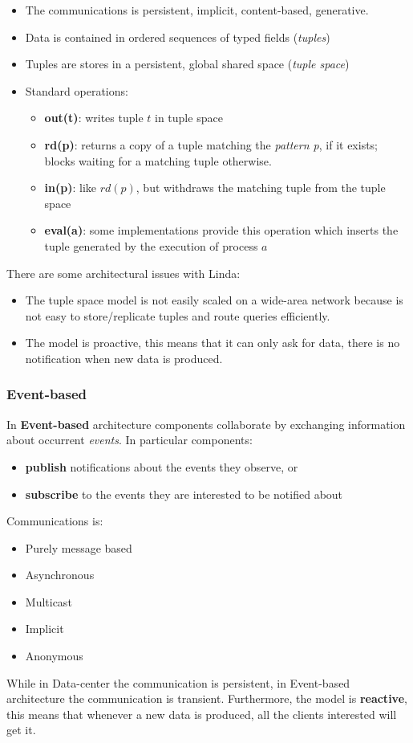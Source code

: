 \documentclass[10pt,a4paper]{article}
\begin{document}
\begin{itemize}
	\item The communications is persistent, implicit, content-based, generative.
	\item Data is contained in ordered sequences of typed fields (\textit{tuples})
	\item Tuples are stores in a persistent, global shared space (\textit{tuple space})
	\item Standard operations:
	\begin{itemize}
		\item \textbf{out(t)}: writes tuple $t$ in tuple space
		\item \textbf{rd(p)}: returns a copy of a tuple matching the \textit{pattern p}, if it exists; blocks waiting for a matching tuple otherwise.
		\item \textbf{in(p)}: like $rd(p)$, but withdraws the matching tuple from the tuple space
		\item \textbf{eval(a)}: some implementations provide this operation which inserts the tuple generated by the execution of process $a$
	\end{itemize}
\end{itemize}
There are some architectural issues with Linda:
\begin{itemize}
	\item The tuple space model is not easily scaled on a wide-area network because is not easy to store/replicate tuples and route queries efficiently.
	\item The model is proactive, this means that it can only ask for data, there is no notification when new data is produced.
\end{itemize}
\subsubsection{Event-based}
In \textbf{Event-based} architecture components collaborate by exchanging information about occurrent \textit{events}. In particular components:
\begin{itemize}
	\item \textbf{publish} notifications about the events they observe, or
	\item \textbf{subscribe} to the events they are interested to be notified about
\end{itemize}
Communications is: 
\begin{itemize}
	\item Purely message based
	\item Asynchronous
	\item Multicast
	\item Implicit
	\item Anonymous
\end{itemize}
While in Data-center the communication is persistent, in Event-based architecture the communication is transient. Furthermore, the model is \textbf{reactive}, this means that whenever a new data is produced, all the clients interested will get it.
\pagebreak
\end{document}
